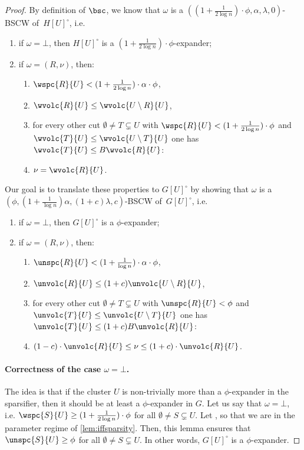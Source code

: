 \begin{proof}[Proof]
	By definition of $\bsc$, we know that $\omega$ is a $((1+\frac{1}{2\log n}) \cdot \phi, \alpha,\lambda,0)$-BSCW of~$H[U]^\circ$, i.e.
	\begin{enumerate}
		\item \label{itdef:exp2} if $\omega=\bot$, then $H[U]^\circ$ is a $(1+\frac{1}{2\log n}) \cdot \phi$-expander;
		\item if $\omega=(R,\nu)$, then:
		\begin{enumerate}
			\item \label{itdef:sparse2} $\wspc{R}{U} < (1+\frac{1}{2\log n}) \cdot \alpha \cdot \phi $,
			\item \label{itdef:smallside2} $\wvolc{R}{U} \le \wvolc{U \setminus R}{U} $,
			\item \label{itdef:bal2} for every other cut $\emptyset \neq T \subsetneq U$ with $\wspc{R}{U} <(1+\frac{1}{2\log n}) \cdot \phi$ and $\wvolc{T}{U} \le \wvolc{U \setminus T}{U}$ one has $\wvolc{T}{U} \le B \wvolc{R}{U} $:
			\item \label{itdef:goodestim2} $\nu =\wvolc{R}{U}$.
		\end{enumerate}
	\end{enumerate}
Our goal is to translate these properties to $G[U]^\circ$ by showing that $\omega$ is a  $(\phi,(1+\frac{1}{\log n})\alpha,(1+c)\lambda,c)$-BSCW of~$G[U]^\circ$, i.e.
\begin{enumerate}
	\item \label{itdef:exp3} if $\omega=\bot$, then $G[U]^\circ$ is a $ \phi$-expander;
	\item if $\omega=(R,\nu)$, then:
	\begin{enumerate}
		\item \label{itdef:sparse3} $\unspc{R}{U} < (1+\frac{1}{\log n}) \cdot\alpha \cdot  \phi $,
		\item \label{itdef:smallside3} $\unvolc{R}{U} \le (1+c)\unvolc{U \setminus R}{U} $,
		\item \label{itdef:bal3} for every other cut $\emptyset \neq T \subsetneq U$ with $\unspc{R}{U} <\phi$ and $\unvolc{T}{U} \le \unvolc{U \setminus T}{U}$ one has $\unvolc{T}{U} \le (1+c)B \unvolc{R}{U} $:
		\item \label{itdef:goodestim3} $(1-c)\cdot\unvolc{R}{U}\le \nu \le (1+c)\cdot\unvolc{R}{U}$.
	\end{enumerate}
\end{enumerate}

	\paragraph{Correctness of the case $\omega = \bot$.} The idea is that if the cluster $U$ is non-trivially more than a $\phi$-expander in the sparsifier, then it should be at least a $\phi$-expander in $G$. Let us say that $\omega=\bot$, i.e. $\wspc{S}{U} \ge  (1+\frac{1}{2\log n})\cdot \phi $ for all $\emptyset \neq S \subsetneq U$. Let , so that we are in the parameter regime of \cref{lem:iffsparsity}. Then, this lemma ensures that $\unspc{S}{U} \ge \phi$ for all $\emptyset \neq S \subsetneq U$. In other words, $G[U]^\circ$ is a $\phi$-expander.
	

\end{proof}
